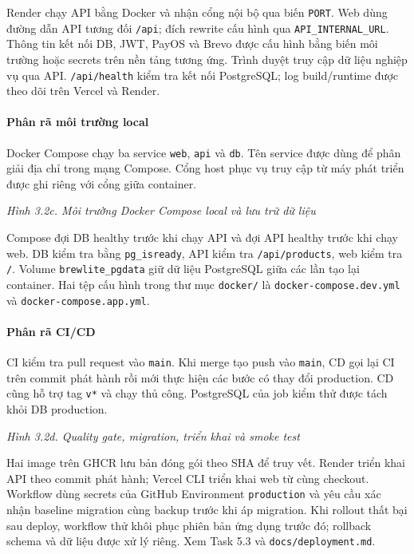 Render chạy API bằng Docker và nhận cổng nội bộ qua biến \texttt{PORT}.
Web dùng đường dẫn API tương đối \nolinkurl{/api}; đích rewrite cấu hình qua
\nolinkurl{API_INTERNAL_URL}. Thông tin kết nối DB, JWT,
PayOS và Brevo được cấu hình bằng biến môi trường hoặc secrets trên nền
tảng tương ứng. Trình duyệt truy cập dữ liệu nghiệp vụ qua API.
\nolinkurl{/api/health} kiểm tra kết nối PostgreSQL; log build/runtime
được theo dõi trên Vercel và Render.

\paragraph{Phân rã môi trường local}
Docker Compose chạy ba service \texttt{web}, \texttt{api} và \texttt{db}.
Tên service được dùng để phân giải địa chỉ trong mạng Compose. Cổng host
phục vụ truy cập từ máy phát triển được ghi riêng với cổng giữa container.

\begin{reportfigure}

\par\small\itshape Hình 3.2c. Môi trường Docker Compose local và lưu trữ dữ liệu
\end{reportfigure}

Compose đợi DB healthy trước khi chạy API và đợi API healthy trước khi
chạy web. DB kiểm tra bằng \texttt{pg\_isready}, API kiểm tra
\nolinkurl{/api/products}, web kiểm tra \nolinkurl{/}. Volume
\texttt{brewlite\_pgdata} giữ dữ liệu PostgreSQL giữa các lần tạo lại
container. Hai tệp cấu hình trong thư mục \nolinkurl{docker/} là
\nolinkurl{docker-compose.dev.yml} và \nolinkurl{docker-compose.app.yml}.

\paragraph{Phân rã CI/CD}
CI kiểm tra pull request vào \texttt{main}. Khi merge tạo push vào
\texttt{main}, CD gọi lại CI trên commit phát hành rồi mới thực hiện các
bước có thay đổi production. CD cũng hỗ trợ tag \nolinkurl{v*} và chạy
thủ công. PostgreSQL của job kiểm thử được tách khỏi DB production.

\begin{reportfigure}

\par\small\itshape Hình 3.2d. Quality gate, migration, triển khai và smoke test
\end{reportfigure}

Hai image trên GHCR lưu bản đóng gói theo SHA để truy vết. Render triển
khai API theo commit phát hành; Vercel CLI triển khai web từ cùng checkout.
Workflow dùng secrets của GitHub Environment \texttt{production} và yêu cầu
xác nhận baseline migration cùng backup trước khi áp migration. Khi rollout
thất bại sau deploy, workflow thử khôi phục phiên bản ứng dụng trước đó;
rollback schema và dữ liệu được xử lý riêng. Xem Task 5.3 và
\nolinkurl{docs/deployment.md}.
